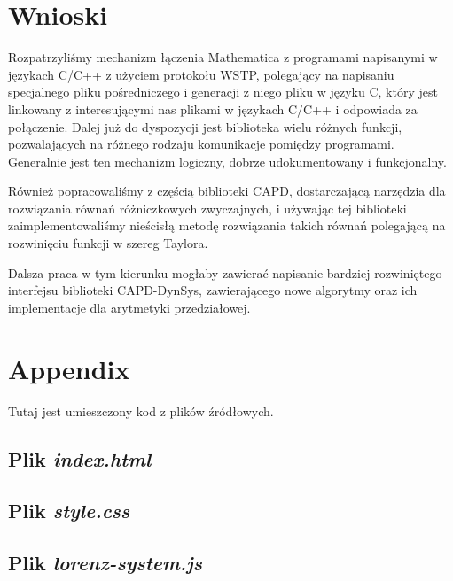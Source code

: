 \documentclass[12pt]{report}
\begin{document}
\chapter{Wnioski}
	\hspace{\parindent} Rozpatrzyliśmy mechanizm łączenia Mathematica z programami napisanymi w językach C/C++ z użyciem protokołu WSTP, polegający na napisaniu specjalnego pliku pośredniczego i generacji z niego pliku w języku C, który jest linkowany z interesującymi nas plikami w językach C/C++ i odpowiada za połączenie. Dalej już do dyspozycji jest biblioteka wielu różnych funkcji, pozwalających na różnego rodzaju komunikacje pomiędzy programami. Generalnie jest ten mechanizm logiczny, dobrze udokumentowany i funkcjonalny.
	
	Również popracowaliśmy z częścią biblioteki CAPD, dostarczającą narzędzia dla rozwiązania równań różniczkowych zwyczajnych, i używając tej biblioteki zaimplementowaliśmy nieścisłą metodę rozwiązania takich równań polegającą na rozwinięciu funkcji w szereg Taylora.
	
	Dalsza praca w tym kierunku mogłaby zawierać napisanie bardziej rozwiniętego interfejsu biblioteki CAPD-DynSys, zawierającego nowe algorytmy oraz ich implementacje dla arytmetyki przedziałowej. 

\chapter{Appendix}
	Tutaj jest umieszczony kod z plików źródłowych.
	
	\section{Plik \textit{index.html}}
	\label{sec:html}
	
	
	\section{Plik \textit{style.css}}
	\label{sec:css}
	
	
	\section{Plik \textit{lorenz-system.js}}
	\label{sec:js}
	
	


\end{document}
